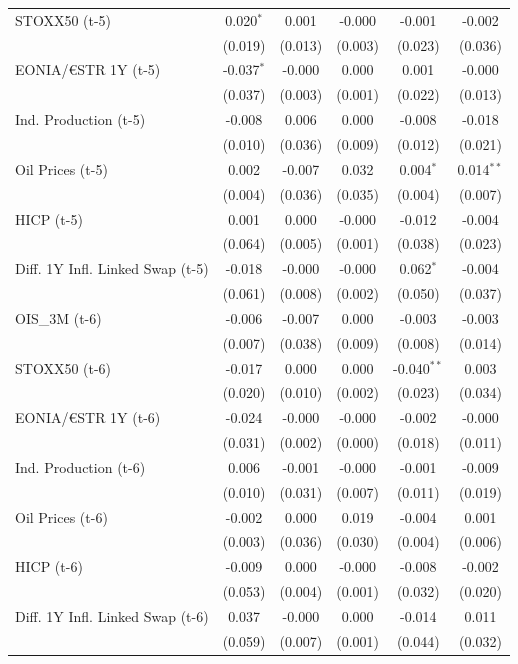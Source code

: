 \begin{longtable}[t]{lccccc}
STOXX50 (t-5) & 0.020$^{*}$ & 0.001 & -0.000 & -0.001 & -0.002\\
 & (0.019) & (0.013) & (0.003) & (0.023) & (0.036)\\
EONIA/€STR 1Y (t-5) & -0.037$^{*}$ & -0.000 & 0.000 & 0.001 & -0.000\\
 & (0.037) & (0.003) & (0.001) & (0.022) & (0.013)\\
Ind. Production (t-5) & -0.008 & 0.006 & 0.000 & -0.008 & -0.018\\
 & (0.010) & (0.036) & (0.009) & (0.012) & (0.021)\\
Oil Prices (t-5) & 0.002 & -0.007 & 0.032 & 0.004$^{*}$ & 0.014$^{**}$\\
 & (0.004) & (0.036) & (0.035) & (0.004) & (0.007)\\
HICP (t-5) & 0.001 & 0.000 & -0.000 & -0.012 & -0.004\\
 & (0.064) & (0.005) & (0.001) & (0.038) & (0.023)\\
Diff. 1Y Infl. Linked Swap (t-5) & -0.018 & -0.000 & -0.000 & 0.062$^{*}$ & -0.004\\
 & (0.061) & (0.008) & (0.002) & (0.050) & (0.037)\\
OIS\_3M (t-6) & -0.006 & -0.007 & 0.000 & -0.003 & -0.003\\
 & (0.007) & (0.038) & (0.009) & (0.008) & (0.014)\\
STOXX50 (t-6) & -0.017 & 0.000 & 0.000 & -0.040$^{**}$ & 0.003\\
 & (0.020) & (0.010) & (0.002) & (0.023) & (0.034)\\
EONIA/€STR 1Y (t-6) & -0.024 & -0.000 & -0.000 & -0.002 & -0.000\\
 & (0.031) & (0.002) & (0.000) & (0.018) & (0.011)\\
Ind. Production (t-6) & 0.006 & -0.001 & -0.000 & -0.001 & -0.009\\
 & (0.010) & (0.031) & (0.007) & (0.011) & (0.019)\\
Oil Prices (t-6) & -0.002 & 0.000 & 0.019 & -0.004 & 0.001\\
 & (0.003) & (0.036) & (0.030) & (0.004) & (0.006)\\
HICP (t-6) & -0.009 & 0.000 & -0.000 & -0.008 & -0.002\\
 & (0.053) & (0.004) & (0.001) & (0.032) & (0.020)\\
Diff. 1Y Infl. Linked Swap (t-6) & 0.037 & -0.000 & 0.000 & -0.014 & 0.011\\
 & (0.059) & (0.007) & (0.001) & (0.044) & (0.032)\\

\end{longtable}
